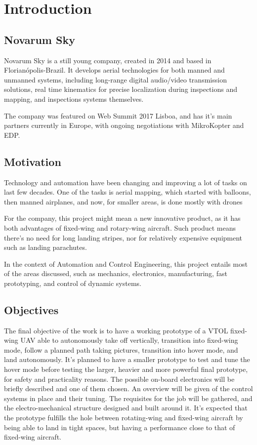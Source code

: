 

\chapter{Introduction} \label{chap:Introduction}


\section{Novarum Sky}
	Novarum Sky is a still young company, created in 2014 and based in Florianópolis-Brazil. It develops aerial technologies for both manned and unmanned systems, including long-range digital audio/video transmission solutions, real time kinematics for precise localization during inspections and mapping, and inspections systems themselves.

The company was featured on Web Summit 2017 Lisboa, and has it's main partners currently in Europe, with ongoing negotiations with MikroKopter and EDP.

\section{Motivation}
Technology and automation have been changing and improving a lot of tasks on last few decades.
%
One of the tasks is aerial mapping, which started with balloons, then manned airplanes, and now, for smaller areas, is done mostly with drones
%

For the company, this project might mean a new innovative product, as it has both advantages of fixed-wing and rotary-wing aircraft.
Such product means there's no need for long landing stripes, nor for relatively expensive equipment such as landing parachutes.
%

In the context of Automation and Control Engineering, this project entails most of the areas discussed, such as mechanics, electronics, manufacturing, fast prototyping, and control of dynamic systems.
%	


\section{Objectives}

%
The final objective of the work is to have a working prototype of a VTOL fixed-wing UAV able to autonomously take off vertically, transition into fixed-wing mode, follow a planned path taking pictures, transition into hover mode, and land autonomously.
%
It's planned to have a smaller prototype to test and tune the hover mode before testing the larger, heavier and more powerful final prototype, for safety and practicality reasons.
%
The possible on-board electronics will be briefly described and one of them chosen.
%
An overview will be given of the control systems in place and their tuning.
%
The requisites for the job will be gathered, and the electro-mechanical structure designed and built around it.
%
It's expected that the prototype fulfills the hole between rotating-wing and fixed-wing aircraft by being able to land in tight spaces, but having a performance close to that of fixed-wing aircraft. 

